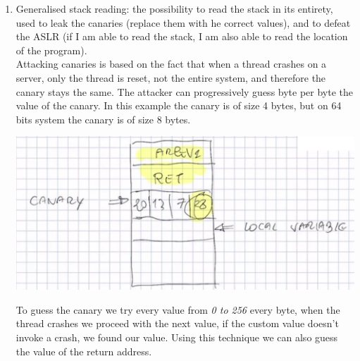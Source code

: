 \documentclass[11pt, oneside]{article}   	%
\begin{document}
\begin{enumerate}
\item Generalised stack reading: the possibility to read the stack in its entirety, used to leak the canaries (replace them with he correct values), and to defeat the ASLR (if I am able to read the stack, I am also able to read the location of the program).\\
Attacking canaries is based on the fact that when a thread crashes on a server, only the thread is reset, not the entire system, and therefore the canary stays the same. The attacker can progressively guess byte per byte the value of the canary. In this example the canary is of size 4 bytes, but on 64 bits system the canary is of size 8 bytes.
\begin{center}
\includegraphics[scale = 0.5]{cattack}
\end{center}
To guess the canary we try every value from \emph{0 to 256} every byte, when the thread crashes we proceed with the next value, if the custom value doesn't invoke a crash, we found our value. Using this technique we can also guess the value of the return address.


\end{enumerate}
\end{document}

